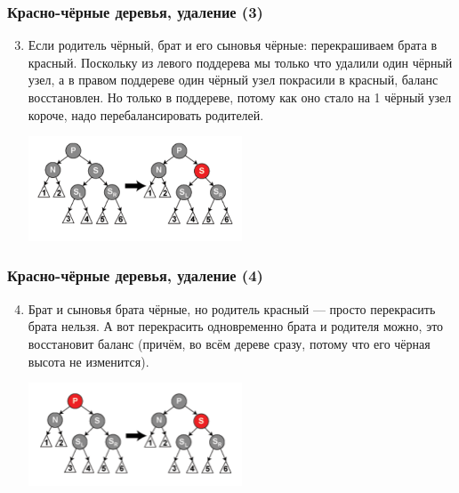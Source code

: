 \documentclass[xetex,mathserif,serif]{beamer}
\begin{document}
	\begin{frame}
		\frametitle{Красно-чёрные деревья, удаление (3)}
		\begin{enumerate}
			\setcounter{enumi}{2}
			\item Если родитель чёрный, брат и его сыновья чёрные: перекрашиваем брата в красный. Поскольку из левого поддерева мы только что удалили один чёрный узел, а в правом поддереве один чёрный узел покрасили в красный, баланс восстановлен. Но только в поддереве, потому как оно стало на 1 чёрный узел короче, надо перебалансировать родителей.
			\begin{center}
				\includegraphics[width=0.5\textwidth]{deletion-from-red-black-tree2.png}
			\end{center}
		\end{enumerate}
	\end{frame}

	\begin{frame}
		\frametitle{Красно-чёрные деревья, удаление (4)}
		\begin{enumerate}
			\setcounter{enumi}{3}
			\item Брат и сыновья брата чёрные, но родитель красный --- просто перекрасить брата нельзя. А вот перекрасить одновременно брата и родителя можно, это восстановит баланс (причём, во всём дереве сразу, потому что его чёрная высота не изменится).
			\begin{center}
				\includegraphics[width=0.5\textwidth]{deletion-from-red-black-tree3.png}
			\end{center}
		\end{enumerate}
	\end{frame}
\end{document}
